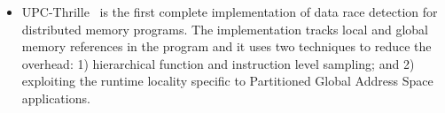 \begin{itemize}

\item UPC-Thrille~\cite{ICS'13,PPoPP'13,SC'11,upc-thrille} is the first complete
implementation of data race detection for distributed memory
programs.  The implementation tracks local and global memory
references in the program and it uses two techniques to reduce the
overhead: 1) hierarchical function and instruction level sampling; and
2) exploiting the runtime locality specific to Partitioned Global
Address Space applications. 



\end{itemize}
